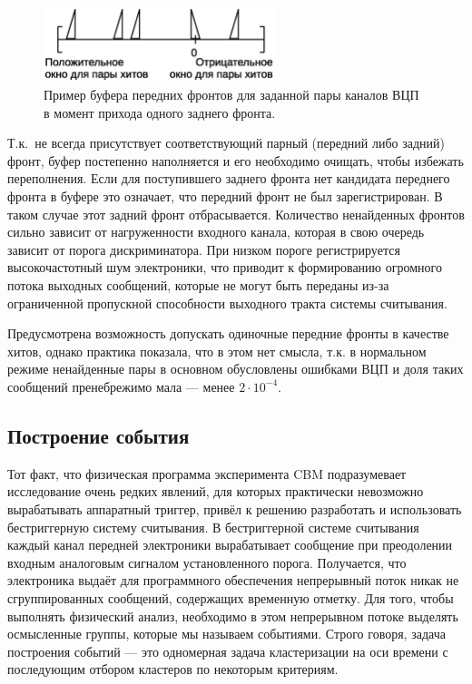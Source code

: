 \begin{figure}[H]
\centering
\includegraphics[width=0.6\textwidth]{pictures/14_Edge_matching_rus.eps}
\caption{Пример буфера передних фронтов для заданной пары каналов ВЦП в момент прихода одного заднего фронта.}
\label{fig:EdgeMatching}
\end{figure}

Т.к.~не всегда присутствует соответствующий парный (передний либо задний) фронт, буфер постепенно наполняется и его необходимо очищать, чтобы избежать переполнения. Если для поступившего заднего фронта нет кандидата переднего фронта в буфере это означает, что передний фронт не был зарегистрирован. В таком случае этот задний фронт отбрасывается. Количество ненайденных фронтов сильно зависит от нагруженности входного канала, которая в свою очередь зависит от порога дискриминатора. При низком пороге регистрируется высокочастотный шум электроники, что приводит к формированию огромного потока выходных сообщений, которые не могут быть переданы из-за ограниченной пропускной способности выходного тракта системы считывания.

Предусмотрена возможность допускать одиночные передние фронты в качестве хитов, однако практика показала, что в этом нет смысла, т.к. в нормальном режиме ненайденные пары в основном обусловлены ошибками ВЦП и доля таких сообщений пренебрежимо мала --- менее $ 2 \cdot 10^{-4} $.

\subsection{Построение события}\label{sec:secEventBuilding}

Тот факт, что физическая программа эксперимента CBM подразумевает исследование очень редких явлений, для которых практически невозможно вырабатывать аппаратный триггер, привёл к решению разработать и использовать бестриггерную систему считывания. В бестриггерной системе считывания каждый канал передней электроники вырабатывает сообщение при преодолении входным аналоговым сигналом установленного порога. Получается, что электроника выдаёт для программного обеспечения непрерывный поток никак не сгруппированных сообщений, содержащих временную отметку. Для того, чтобы выполнять физический анализ, необходимо в этом непрерывном потоке выделять осмысленные группы, которые мы называем событиями. Строго говоря, задача построения событий --- это одномерная задача кластеризации на оси времени с последующим отбором кластеров по некоторым критериям.

